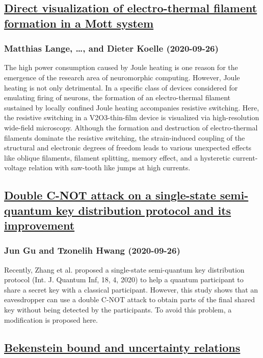 \subsection*{\href{http://arxiv.org/abs/2009.12536v1}{Direct visualization of electro-thermal filament formation in a Mott  system}}
\subsubsection*{Matthias Lange, \dots, and Dieter Koelle (2020-09-26)}
The high power consumption caused by Joule heating is one reason for the
emergence of the research area of neuromorphic computing. However, Joule
heating is not only detrimental. In a specific class of devices considered for
emulating firing of neurons, the formation of an electro-thermal filament
sustained by locally confined Joule heating accompanies resistive switching.
Here, the resistive switching in a V2O3-thin-film device is visualized via
high-resolution wide-field microscopy. Although the formation and destruction
of electro-thermal filaments dominate the resistive switching, the
strain-induced coupling of the structural and electronic degrees of freedom
leads to various unexpected effects like oblique filaments, filament splitting,
memory effect, and a hysteretic current-voltage relation with saw-tooth like
jumps at high currents.

\subsection*{\href{http://arxiv.org/abs/2009.12535v1}{Double C-NOT attack on a single-state semi-quantum key distribution  protocol and its improvement}}
\subsubsection*{Jun Gu and Tzonelih Hwang (2020-09-26)}
Recently, Zhang et al. proposed a single-state semi-quantum key distribution
protocol (Int. J. Quantum Inf, 18, 4, 2020) to help a quantum participant to
share a secret key with a classical participant. However, this study shows that
an eavesdropper can use a double C-NOT attack to obtain parts of the final
shared key without being detected by the participants. To avoid this problem, a
modification is proposed here.

\subsection*{\href{http://arxiv.org/abs/2009.12530v1}{Bekenstein bound and uncertainty relations}}
